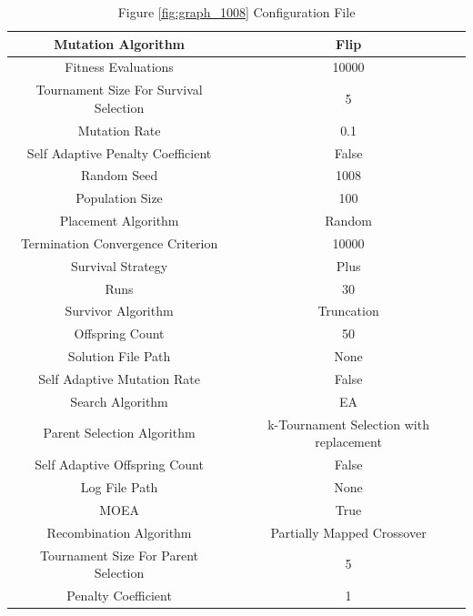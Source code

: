 \documentclass{standalone}
\begin{document}
\begin{table}[!htb]
	\centering
	\caption{Figure \ref{fig:graph_1008} Configuration File}
	\label{tab:graph_1008}
	\begin{tabular}{| c | c |}
		\hline
		Mutation Algorithm		& Flip		 \\
		\hline
		Fitness Evaluations		& 10000		 \\
		\hline
		Tournament Size For Survival Selection		& 5		 \\
		\hline
		Mutation Rate		& 0.1		 \\
		\hline
		Self Adaptive Penalty Coefficient		& False		 \\
		\hline
		Random Seed		& 1008		 \\
		\hline
		Population Size		& 100		 \\
		\hline
		Placement Algorithm		& Random		 \\
		\hline
		Termination Convergence Criterion		& 10000		 \\
		\hline
		Survival Strategy		& Plus		 \\
		\hline
		Runs		& 30		 \\
		\hline
		Survivor Algorithm		& Truncation		 \\
		\hline
		Offspring Count		& 50		 \\
		\hline
		Solution File Path		& None		 \\
		\hline
		Self Adaptive Mutation Rate		& False		 \\
		\hline
		Search Algorithm		& EA		 \\
		\hline
		Parent Selection Algorithm		& k-Tournament Selection with replacement		 \\
		\hline
		Self Adaptive Offspring Count		& False		 \\
		\hline
		Log File Path		& None		 \\
		\hline
		MOEA		& True		 \\
		\hline
		Recombination Algorithm		& Partially Mapped Crossover		 \\
		\hline
		Tournament Size For Parent Selection		& 5		 \\
		\hline
		Penalty Coefficient		& 1		 \\
		\hline
	\end{tabular}
\end{table}
\end{document}
